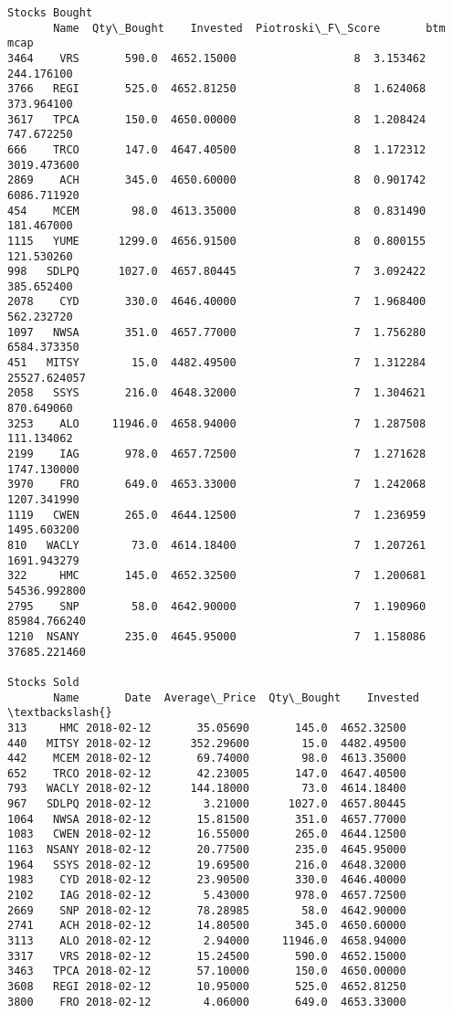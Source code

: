 \documentclass[11pt]{article}
\begin{document}
\begin{Verbatim}[commandchars=\\\{\}]
Stocks Bought
       Name  Qty\_Bought    Invested  Piotroski\_F\_Score       btm          mcap
3464    VRS       590.0  4652.15000                  8  3.153462    244.176100
3766   REGI       525.0  4652.81250                  8  1.624068    373.964100
3617   TPCA       150.0  4650.00000                  8  1.208424    747.672250
666    TRCO       147.0  4647.40500                  8  1.172312   3019.473600
2869    ACH       345.0  4650.60000                  8  0.901742   6086.711920
454    MCEM        98.0  4613.35000                  8  0.831490    181.467000
1115   YUME      1299.0  4656.91500                  8  0.800155    121.530260
998   SDLPQ      1027.0  4657.80445                  7  3.092422    385.652400
2078    CYD       330.0  4646.40000                  7  1.968400    562.232720
1097   NWSA       351.0  4657.77000                  7  1.756280   6584.373350
451   MITSY        15.0  4482.49500                  7  1.312284  25527.624057
2058   SSYS       216.0  4648.32000                  7  1.304621    870.649060
3253    ALO     11946.0  4658.94000                  7  1.287508    111.134062
2199    IAG       978.0  4657.72500                  7  1.271628   1747.130000
3970    FRO       649.0  4653.33000                  7  1.242068   1207.341990
1119   CWEN       265.0  4644.12500                  7  1.236959   1495.603200
810   WACLY        73.0  4614.18400                  7  1.207261   1691.943279
322     HMC       145.0  4652.32500                  7  1.200681  54536.992800
2795    SNP        58.0  4642.90000                  7  1.190960  85984.766240
1210  NSANY       235.0  4645.95000                  7  1.158086  37685.221460

Stocks Sold
       Name       Date  Average\_Price  Qty\_Bought    Invested  \textbackslash{}
313     HMC 2018-02-12       35.05690       145.0  4652.32500
440   MITSY 2018-02-12      352.29600        15.0  4482.49500
442    MCEM 2018-02-12       69.74000        98.0  4613.35000
652    TRCO 2018-02-12       42.23005       147.0  4647.40500
793   WACLY 2018-02-12      144.18000        73.0  4614.18400
967   SDLPQ 2018-02-12        3.21000      1027.0  4657.80445
1064   NWSA 2018-02-12       15.81500       351.0  4657.77000
1083   CWEN 2018-02-12       16.55000       265.0  4644.12500
1163  NSANY 2018-02-12       20.77500       235.0  4645.95000
1964   SSYS 2018-02-12       19.69500       216.0  4648.32000
1983    CYD 2018-02-12       23.90500       330.0  4646.40000
2102    IAG 2018-02-12        5.43000       978.0  4657.72500
2669    SNP 2018-02-12       78.28985        58.0  4642.90000
2741    ACH 2018-02-12       14.80500       345.0  4650.60000
3113    ALO 2018-02-12        2.94000     11946.0  4658.94000
3317    VRS 2018-02-12       15.24500       590.0  4652.15000
3463   TPCA 2018-02-12       57.10000       150.0  4650.00000
3608   REGI 2018-02-12       10.95000       525.0  4652.81250
3800    FRO 2018-02-12        4.06000       649.0  4653.33000


\end{Verbatim}
\end{document}
